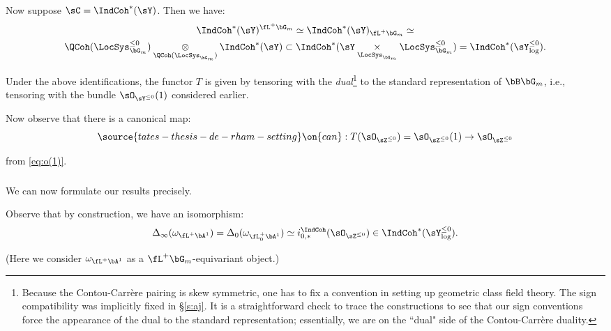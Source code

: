 \subsubsection{}

Now suppose $\sC = \IndCoh^*(\sY)$. Then we have:
%
\[
\begin{gathered}
\IndCoh^*(\sY)^{\fL^+\bG_m} \simeq \IndCoh^*(\sY)_{\fL^+\bG_m} \simeq \\
\QCoh(\LocSys_{\bG_m}^{\leq 0}) \underset{\QCoh(\LocSys_{\bG_m})}{\otimes}
\IndCoh^*(\sY) \subset
\IndCoh^*(\sY \underset{\LocSys_{\bG_m}}{\times} \LocSys_{\bG_m}^{\leq 0}) =
\IndCoh^*(\sY_{\log}^{\leq 0}).
\end{gathered}
\]

Under the above
identifications, the functor $T$ is given by tensoring with
the \emph{dual}\footnote{Because the Contou-Carr\`ere pairing
is skew symmetric, one has to fix a convention in setting up geometric
class field theory. The sign compatibility was implicitly fixed in
\S \ref{s:aj}. It is a straightforward check to trace the constructions
to see that our sign conventions force the appearance of the dual to the
standard representation; essentially, we are on the ``dual" side of the
Contou-Carr\`ere duality.}
to the standard representation of $\bB \bG_m$, i.e., tensoring with the
bundle $\sO_{\sY^{\leq 0}}(1)$ considered earlier.

Now observe that there is a canonical map:
%
\begin{equation}\label{eq:can-unit-spec}
\source{tates-thesis-de-rham-setting}
\on{can}:T(\sO_{\sZ^{\leq 0}}) =
\sO_{\sZ^{\leq 0}}(1) \to \sO_{\sZ^{\leq 0}}
\end{equation}

 from \eqref{eq:o(1)}.

\subsubsection{}

We can now formulate our results precisely.

Observe that by construction, we have
an isomorphism:
%
\[
\Delta_{\infty}(\omega_{\fL^+\bA^1}) = \Delta_0(\omega_{\fL_0^+\bA^1}) \simeq
i_{0,*}^{\IndCoh}(\sO_{\sZ^{\leq 0}}) \in \IndCoh^*(\sY_{\log}^{\leq 0}).
\]

 (Here we consider $\omega_{\fL^+\bA^1}$ as a $\fL^+\bG_m$-equivariant
object.)

